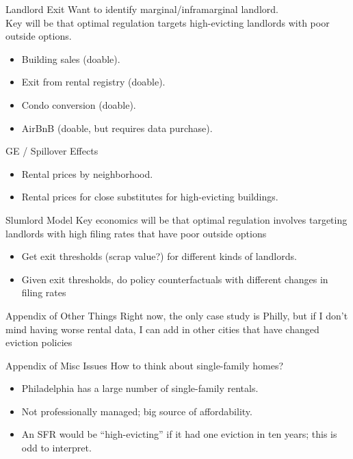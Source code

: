 \documentclass[aspectratio=169]{beamer}
\begin{document}
\begin{frame}{Landlord Exit}
Want to identify marginal/inframarginal landlord.\\
Key will be that optimal regulation targets high-evicting landlords with poor outside options.

\begin{itemize}
  \item Building sales (doable).
  \item Exit from rental registry (doable).
  \item Condo conversion (doable).
  \item AirBnB (doable, but requires data purchase).
\end{itemize}
\end{frame}


\begin{frame}{GE / Spillover Effects}
\begin{itemize}
  \item Rental prices by neighborhood.
  \item Rental prices for close substitutes for high-evicting buildings.
\end{itemize}
\end{frame}


\begin{frame}{Slumlord Model}
Key economics will be that optimal regulation involves targeting landlords with high filing rates that have poor outside options
\begin{itemize}
  \item Get exit thresholds (scrap value?) for different kinds of landlords.
  \item Given exit thresholds, do policy counterfactuals with different changes in filing rates
\end{itemize}
\end{frame}


\appendix

\begin{frame}{Appendix of Other Things}
Right now, the only case study is Philly, but if I don't mind having worse rental data, I can add in other cities that have changed eviction policies
    
\end{frame}

\begin{frame}{Appendix of Misc Issues}
How to think about single-family homes?
\begin{itemize}
  \item Philadelphia has a large number of single-family rentals.
  \item Not professionally managed; big source of affordability.
  \item An SFR would be “high-evicting” if it had one eviction in ten years; this is odd to interpret.
\end{itemize}
\end{frame}
\end{document}
